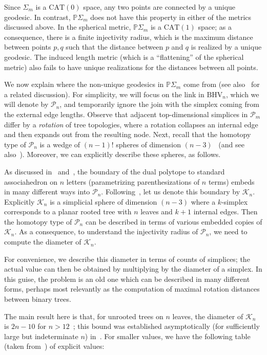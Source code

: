 \documentclass[a4paper,11pt]{article}
\newcommand{\CAT}{\textrm{CAT}}
\newcommand{\BHV}{\textrm{BHV}}
\newcommand{\aK}{\mathcal{K}}
\newcommand{\aP}{\mathcal{P}}
\begin{document}
Since $\Sigma_m$ is a $\CAT(0)$ space, any two points are connected by a unique geodesic.
In contrast, $\mathbb{P}\Sigma_m$ does not have this property in either of the metrics discussed above.
In the spherical metric, $\mathbb{P}\Sigma_m$ is a $\CAT(1)$ space; as a consequence, there is a finite injectivity radius, which is the maximum distance between points $p,q$ such that the distance between $p$ and $q$ is realized by a unique geodesic.
The induced length metric (which is a ``flattening'' of the spherical metric) also fails to have unique realizations for the distances between all points.

We now explain where the non-unique geodesics in $\mathbb{P}\Sigma_m$ come from (see also~\cite[3.3]{billera2001geometry} for a related discussion).
For simplicity, we will focus on the link in $\BHV_n$, which we will denote by $\aP_n$, and temporarily ignore the join with the simplex coming from the external edge lengths.
Observe that adjacent top-dimensional simplices in $\aP_m$ differ by a {\em rotation} of tree topologies, where a rotation collapses an internal edge and then expands out from the resulting node.
Next, recall that the homotopy type of $\aP_n$ is a wedge of $(n-1)!$ spheres of dimension $(n-3)$~\cite{robinson1996tree} (and see also~\cite[Thm. 6]{devadoss2014polyhedral}).
Moreover, we can explicitly describe these spheres, as follows.

As discussed in~\cite[Prop. 1]{devadoss2014polyhedral} and~\cite[\S 3.1]{billera2001geometry}, the boundary of the dual polytope to standard associahedron on $n$ letters (parametrizing parenthesizations of $n$ terms) embeds in many different ways into $\aP_n$.
Following~\cite{devadoss2014polyhedral}, let us denote this boundary by $\aK_n$.
Explicitly $\aK_n$ is a simplicial sphere of dimension $(n-3)$ where a $k$-simplex corresponds to a planar rooted tree with $n$ leaves and $k+1$ internal edges.
Then the homotopy type of $\aP_n$ can be described in terms of various embedded copies of $\aK_n$.
As a consequence, to understand the injectivity radius of $\aP_n$, we need to compute the diameter of $\aK_n$.

For convenience, we describe this diameter in terms of counts of simplices; the actual value can then be obtained by multiplying by the diameter of a simplex.
In this guise, the problem is an old one which can be described in many different forms, perhaps most relevantly as the computation of maximal rotation distances between binary trees.

The main result here is that, for unrooted trees on $n$ leaves, the diameter of $\aK_n$ is $2n - 10$ for $n > 12$~\cite{pournin2014diameter}; this bound was established asymptotically (for sufficiently large but indeterminate $n$) in~\cite{sleator1988rotation}.
For smaller values, we have the following table (taken from~\cite[\S2.3]{sleator1988rotation}) of explicit values:
\end{document}
